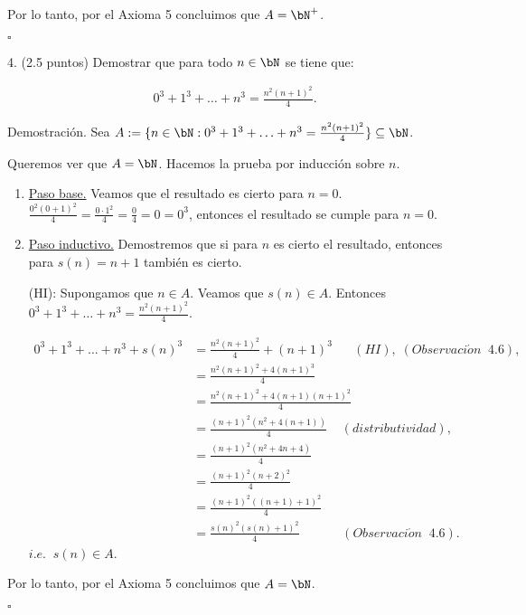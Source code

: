 \documentclass[letterpaper,11pt]{article}
\begin{document}
  Por lo tanto, por el Axioma 5 concluimos que $A = \bN^+$.

  \begin{flushright}
    $\square$
  \end{flushright}

  4. (2.5 puntos) Demostrar que para todo $n \in \bN$ se tiene que:

  \begin{align*}
    0^3 + 1^3 + \dotsc + n^3 = \frac{n^2 (n+1)^2}{4}.
  \end{align*}

  Demostración. Sea $A := \{ n \in \bN : 0^3 + 1^3 + \dotsc + n^3 = \frac{n^2 (n+1)^2}{4} \} \subseteq \bN$.

  Queremos ver que $A = \bN$. Hacemos la prueba por inducción sobre $n$.

  \begin{adjustwidth}{1cm}{0cm}
    \begin{enumerate}[1.]
      \item \underline{Paso base.} Veamos que el resultado es cierto para $n = 0$. \newline
        $\frac{0^2(0+1)^2}{4} = \frac{0 \cdot 1^2}{4} = \frac{0}{4} = 0 = 0^3$, entonces el resultado se cumple para $n = 0$.
      \item \underline{Paso inductivo.} Demostremos que si para $n$ es cierto el resultado,
       entonces para $s(n) = n + 1$ también es cierto. \newline

      (HI): Supongamos que $n \in A$. Veamos que $s(n) \in A$.
      Entonces $0^3 + 1^3 + \dotsc + n^3 = \frac{n^2 (n+1)^2}{4}$.

      \begin{align*}
        0^3 + 1^3 + \dotsc + n^3 + s(n)^3 &= \frac{n^2 (n+1)^2}{4} + (n+1)^3  \;\;\;\;\;\;  (HI), \; (Observaci\acute{o}n \;\; 4.6), \\
        &= \frac{n^2 (n+1)^2 + 4(n+1)^3}{4} \\
        &= \frac{n^2 (n+1)^2 + 4(n+1)(n+1)^2}{4} \\
        &= \frac{(n+1)^2(n^2 + 4(n+1))}{4} \;\;\;\; (distributividad), \\
        &= \frac{(n+1)^2(n^2 + 4n + 4)}{4} \\
        &= \frac{(n+1)^2(n + 2)^2}{4} \\
        &= \frac{(n+1)^2((n + 1) + 1)^2}{4} \\
        &= \frac{s(n)^2(s(n) + 1)^2}{4} \;\;\;\;\;\;\;\;\;\;\;\; (Observaci\acute{o}n \;\; 4.6).
      \end{align*}
      $i.e. \;\; s(n) \in A$.
    \end{enumerate}
  \end{adjustwidth}

  Por lo tanto, por el Axioma 5 concluimos que $A = \bN$.

  \begin{flushright}
    $\square$
  \end{flushright}
\end{document}
